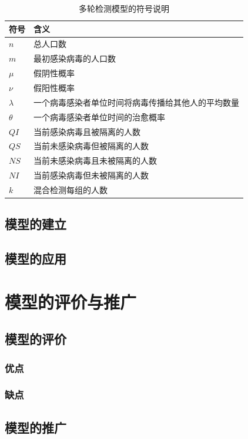 \documentclass[12pt]{article}
\begin{document}
\begin{table}[h]
\centering
\begin{tabular}{|l|l|} 
\hline
符号 & 含义 \\
\hline
$n$ & 总人口数 \\
$m$ & 最初感染病毒的人口数 \\
$\mu$ & 假阴性概率 \\
$\nu$ & 假阳性概率 \\
$\lambda$ & 一个病毒感染者单位时间将病毒传播给其他人的平均数量 \\
$\theta$ & 一个病毒感染者单位时间的治愈概率 \\
$QI$ & 当前感染病毒且被隔离的人数 \\
$QS$ & 当前未感染病毒但被隔离的人数 \\
$NS$ & 当前未感染病毒且未被隔离的人数 \\
$NI$ & 当前感染病毒但未被隔离的人数 \\
$k$ & 混合检测每组的人数 \\
\hline
\end{tabular}
\caption{多轮检测模型的符号说明}
\end{table}

\subsection{模型的建立}

\subsection{模型的应用}

{\centering\section{模型的评价与推广}}

\subsection{模型的评价}

\subsubsection{优点}

\subsubsection{缺点}

\subsection{模型的推广}
\end{document}
